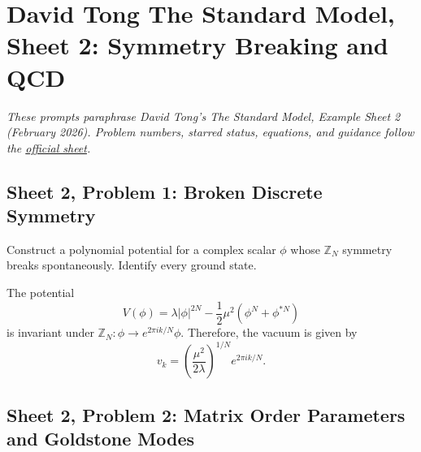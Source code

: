 \section{David Tong The Standard Model, Sheet 2: Symmetry Breaking and QCD}

\noindent\textit{These prompts paraphrase David Tong's \emph{The Standard Model},
Example Sheet 2 (February 2026). Problem numbers, starred status, equations,
and guidance follow the
\href{https://davidtong.org/pdfs/teaching/standard-model/rw2.pdf}{official sheet}.}

\subsection{Sheet 2, Problem 1: Broken Discrete Symmetry}

Construct a polynomial potential for a complex scalar $\phi$ whose
$\mathbb Z_N$ symmetry breaks spontaneously. Identify every ground
state.
\begin{solution}
    The potential
    \begin{equation}
        V(\phi) = \lambda|\phi|^{2N} - \frac{1}{2}\mu^2 (\phi^N + \phi^{*N})
    \end{equation}
    is invariant under $\mathbb{Z}_N: \phi \to e^{2\pi ik/N}\phi$. Therefore, the vacuum is given by
    \begin{equation}
        v_k = \left(\frac{\mu^2}{2\lambda}\right)^{1/N}e^{2\pi i k /N}.
    \end{equation}
\end{solution}

\subsection{Sheet 2, Problem 2: Matrix Order Parameters and Goldstone Modes}

